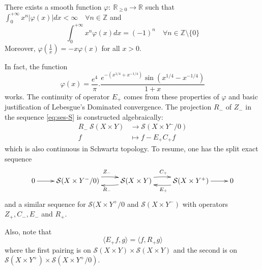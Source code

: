 \begin{lemma}
\label{lem:construction-varphi}
There exists a smooth function \(\varphi:\ \mathbb{R}_{\geq 0} \longrightarrow
\mathbb{R}\) such that
\(\int_0^{+\infty} x^n |\varphi(x)|dx <\infty \quad\forall n\in \mathbb{Z}\)
and 
\[
  \int_0^{+\infty} x^n \varphi(x)dx = (-1)^n \quad\forall n\in \mathbb{Z}\setminus\{0\}
\]
Moreover, \(\varphi(\frac{1}{x}) = -x \varphi(x)\) for all \(x>0\).
\end{lemma}

In fact, the function
\[
 \varphi(x) = \frac{e^4}{\pi}.\frac{e^{-(x^{1/4} + x^{-1/4})} \sin(x^{1/4} - x^{-1/4})}{1+x}
\]
works. The continuity of operator \(E_+\) comes from these properties of \(\varphi\)
and basic justification of Lebesgue's Dominated convergence. The projection \(R_-\) of
\(Z_-\) in the sequence \eqref{eq:ses-S} is constructed algebraically:
\begin{align*}
  R_-\ \mathcal{S}(X\times Y) &\longrightarrow \mathcal{S}(X\times Y^-/0)\\
       f &\longmapsto f- E_+C_+ f
\end{align*}
which is also continuous in Schwartz topology. To resume, one has the split exact sequence
\begin{equation}
\label{eq:ses-S-split}
\xymatrix{
0 \ar@{->}[r] & \mathcal{S}(X\times Y^-/0) \ar@/^/@{->}[r]^{Z_-} & \mathcal{S}(X\times Y) \ar@/^/@{->}[r]^{C_+} \ar@/^/@{->}[l]^{R_-} & \mathcal{S}(X\times Y^+) \ar@{->}[r] \ar@/^/@{->}[l]^{E_+} & 0
}
\end{equation}
and a similar sequence for \(\mathcal{S}(X\times Y^+/0\) and \(\mathcal{S}(X\times Y^-)\) with
operators \(Z_+, C_-, E_-\) and \(R_+\).


Also, note that
\begin{equation}
\label{eq:Eplus-Rplus}
\langle E_+ f, g \rangle = \langle f, R_+ g \rangle
\end{equation}
where the first pairing is on \(\mathcal{S}(X\times Y) \times \mathcal{S}(X\times Y)\)
and the second is on \(\mathcal{S}(X\times Y^+)\times \mathcal{S}(X\times Y^+/0)\).

